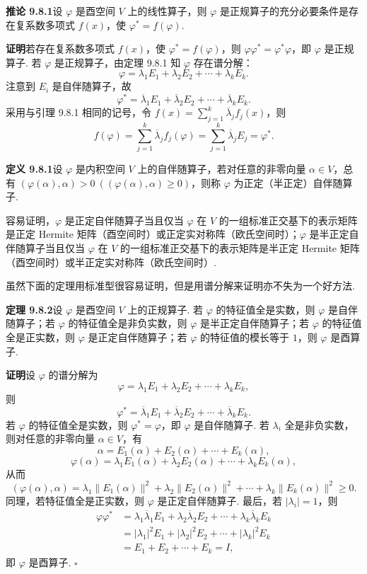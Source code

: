 \documentclass[UTF8, 12pt, fontset=fandol, oneside]{ctexart}
\begin{document}
\noindent\textbf{推论 9.8.1}\quad 设 $\varphi$ 是酉空间 $V$ 上的线性算子，则 $\varphi$ 是正规算子的充分必要条件是存在复系数多项式 $f(x)$，使 $\varphi^*=f(\varphi)$.

\noindent\textbf{证明}\quad 若存在复系数多项式 $f(x)$，使 $\varphi^*=f(\varphi)$，则 $\varphi\varphi^*=\varphi^*\varphi$，即 $\varphi$ 是正规算子. 若 $\varphi$ 是正规算子，由定理 9.8.1 知 $\varphi$ 存在谱分解：
\[
  \varphi=\lambda_1E_1+\lambda_2E_2+\cdots+\lambda_kE_k.
\]
注意到 $E_i$ 是自伴随算子，故
\[
  \varphi^*=\overline\lambda_1E_1+\overline\lambda_2E_2+\cdots+\overline\lambda_kE_k.
\]
采用与引理 9.8.1 相同的记号，令 $f(x)=\sum_{j=1}^k\overline\lambda_j f_j(x)$，则
\[
  f(\varphi)=\sum_{j=1}^k\overline\lambda_j f_j(\varphi)=\sum_{j=1}^k\overline\lambda_j E_j=\varphi^*.
\]

\noindent\textbf{定义 9.8.1}\quad 设 $\varphi$ 是内积空间 $V$ 上的自伴随算子，若对任意的非零向量 $\alpha\in V$，总有 $(\varphi(\alpha),\alpha)>0\ ((\varphi(\alpha),\alpha)\ge0)$，则称 $\varphi$ 为正定（半正定）自伴随算子.

容易证明，$\varphi$ 是正定自伴随算子当且仅当 $\varphi$ 在 $V$ 的一组标准正交基下的表示矩阵是正定 Hermite 矩阵（酉空间时）或正定实对称阵（欧氏空间时）；$\varphi$ 是半正定自伴随算子当且仅当 $\varphi$ 在 $V$ 的一组标准正交基下的表示矩阵是半正定 Hermite 矩阵（酉空间时）或半正定实对称阵（欧氏空间时）.

虽然下面的定理用标准型很容易证明，但是用谱分解来证明亦不失为一个好方法.

\noindent\textbf{定理 9.8.2}\quad 设 $\varphi$ 是酉空间 $V$ 上的正规算子. 若 $\varphi$ 的特征值全是实数，则 $\varphi$ 是自伴随算子；若 $\varphi$ 的特征值全是非负实数，则 $\varphi$ 是半正定自伴随算子；若 $\varphi$ 的特征值全是正实数，则 $\varphi$ 是正定自伴随算子；若 $\varphi$ 的特征值的模长等于 $1$，则 $\varphi$ 是酉算子.

\noindent\textbf{证明}\quad 设 $\varphi$ 的谱分解为
\[
  \varphi=\lambda_1E_1+\lambda_2E_2+\cdots+\lambda_kE_k,
\]
则
\[
  \varphi^*=\overline\lambda_1E_1+\overline\lambda_2E_2+\cdots+\overline\lambda_kE_k.
\]
若 $\varphi$ 的特征值全是实数，则 $\varphi^*=\varphi$，即 $\varphi$ 是自伴随算子. 若 $\lambda_i$ 全是非负实数，则对任意的非零向量 $\alpha\in V$，有
\[
  \alpha=E_1(\alpha)+E_2(\alpha)+\cdots+E_k(\alpha),
\]
\[
  \varphi(\alpha)=\lambda_1E_1(\alpha)+\lambda_2E_2(\alpha)+\cdots+\lambda_kE_k(\alpha),
\]
从而
\[
  (\varphi(\alpha),\alpha)=\lambda_1\|E_1(\alpha)\|^2+\lambda_2\|E_2(\alpha)\|^2+\cdots+\lambda_k\|E_k(\alpha)\|^2\ge0.
\]
同理，若特征值全是正实数，则 $\varphi$ 是正定自伴随算子. 最后，若 $|\lambda_i|=1$，则
\[
\begin{aligned}
  \varphi\varphi^*
  &= \lambda_1\overline\lambda_1E_1+\lambda_2\overline\lambda_2E_2+\cdots+\lambda_k\overline\lambda_kE_k\\
  &= |\lambda_1|^2E_1+|\lambda_2|^2E_2+\cdots+|\lambda_k|^2E_k\\
  &= E_1+E_2+\cdots+E_k=I,
\end{aligned}
\]
即 $\varphi$ 是酉算子. $\square$
\end{document}

